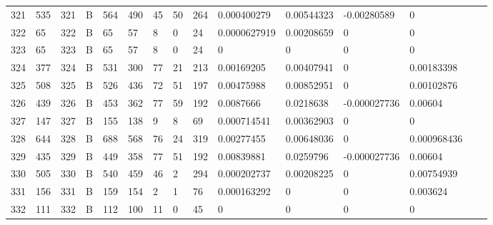 \begin{longtable}{lllllllllllllll}
	321 & 535               & 321 & B   & 564               & 490               & 45                & 50   & 264        & 0.000400279    & 0.00544323     & -0.00280589   & 0            \\
	322 & 65                & 322 & B   & 65                & 57                & 8                 & 0    & 24         & 0.0000627919   & 0.00208659     & 0             & 0            \\
	323 & 65                & 323 & B   & 65                & 57                & 8                 & 0    & 24         & 0              & 0              & 0             & 0            \\
	324 & 377               & 324 & B   & 531               & 300               & 77                & 21   & 213        & 0.00169205     & 0.00407941     & 0             & 0.00183398   \\
	325 & 508               & 325 & B   & 526               & 436               & 72                & 51   & 197        & 0.00475988     & 0.00852951     & 0             & 0.00102876   \\
	326 & 439               & 326 & B   & 453               & 362               & 77                & 59   & 192        & 0.0087666      & 0.0218638      & -0.000027736  & 0.00604      \\
	327 & 147               & 327 & B   & 155               & 138               & 9                 & 8    & 69         & 0.000714541    & 0.00362903     & 0             & 0            \\
	328 & 644               & 328 & B   & 688               & 568               & 76                & 24   & 319        & 0.00277455     & 0.00648036     & 0             & 0.000968436  \\
	329 & 435               & 329 & B   & 449               & 358               & 77                & 51   & 192        & 0.00839881     & 0.0259796      & -0.000027736  & 0.00604      \\
	330 & 505               & 330 & B   & 540               & 459               & 46                & 2    & 294        & 0.000202737    & 0.00208225     & 0             & 0.00754939   \\
	331 & 156               & 331 & B   & 159               & 154               & 2                 & 1    & 76         & 0.000163292    & 0              & 0             & 0.003624     \\
	332 & 111               & 332 & B   & 112               & 100               & 11                & 0    & 45         & 0              & 0              & 0             & 0            \\

\end{longtable}
